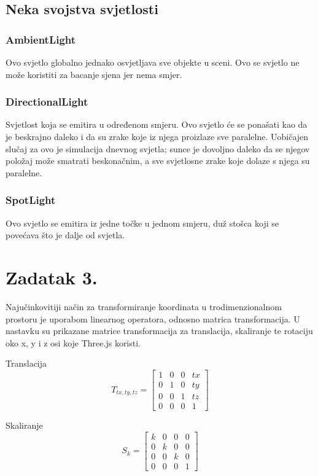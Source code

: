 \documentclass[a4paper,12pt]{article}
\begin{document}
\pagebreak
\subsection{Neka svojstva svjetlosti}
\subsubsection{AmbientLight}
\hspace{10mm} Ovo svjetlo globalno jednako osvjetljava sve objekte u sceni.
Ovo se svjetlo ne može koristiti za bacanje sjena jer nema smjer.

\subsubsection{DirectionalLight}
\hspace{10mm} Svjetlost koja se emitira u određenom smjeru. Ovo svjetlo će se ponašati kao da je beskrajno daleko i da su zrake koje iz njega proizlaze sve paralelne. Uobičajen slučaj za ovo je simulacija dnevnog svjetla; sunce je dovoljno daleko da se njegov položaj može smatrati beskonačnim, a sve svjetlosne zrake koje dolaze s njega su paralelne.

\subsubsection{SpotLight}
\hspace{10mm} Ovo svjetlo se emitira iz jedne točke u jednom smjeru, duž stošca koji se povećava što je dalje od svjetla.

\pagebreak


\section{Zadatak 3.}
Najučinkovitiji način za transformiranje koordinata u trodimenzionalnom prostoru je uporabom
linearnog operatora, odnosno matrica transformacija. U nastavku su prikazane matrice transformacija
za translacija, skaliranje te rotaciju oko x, y i z osi koje Three.js koristi.

Translacija
\[
T_{tx,ty,tz}=
\begin{bmatrix}
    1 & 0 & 0 & tx \\
    0 & 1 & 0 & ty \\
    0 & 0 & 1 & tz \\
    0 & 0 & 0 & 1
\end{bmatrix}
\]

Skaliranje
\[
S_{k}=
\begin{bmatrix}
    k & 0 & 0 & 0 \\
    0 & k & 0 & 0 \\
    0 & 0 & k & 0 \\
    0 & 0 & 0 & 1
\end{bmatrix}
\]
\end{document}
